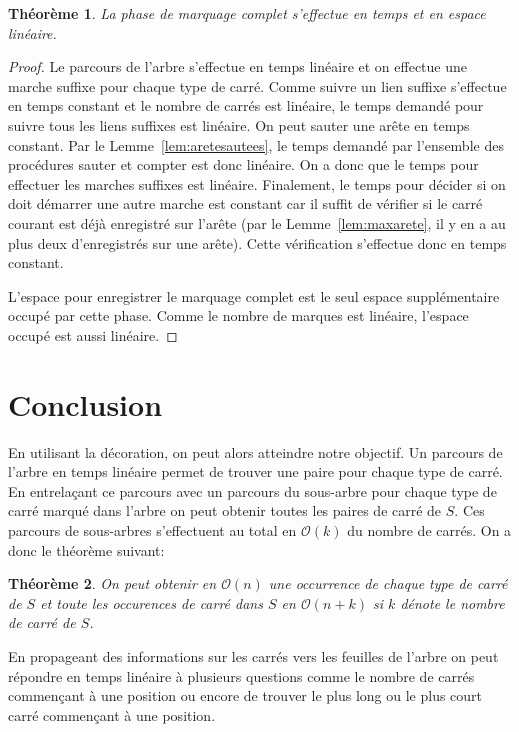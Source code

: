 \documentclass[10pt,letterpaper,oneside]{article}
\newtheorem{theorem}{Théorème}
\newcommand{\bigo}{\mathcal{O}}
\begin{document}
\begin{theorem}
    La phase de marquage complet s'effectue en temps et en espace linéaire.
\end{theorem}
\begin{proof}
    Le parcours de l'arbre s'effectue en temps linéaire et on effectue une marche suffixe pour chaque type de carré. Comme suivre un lien suffixe s'effectue en temps constant et le nombre de carrés est linéaire, le temps demandé pour suivre tous les liens suffixes est linéaire.
    On peut sauter une arête en temps constant. Par le Lemme~\ref{lem:aretesautees}, le temps demandé par l'ensemble des procédures sauter et compter est donc linéaire. On a donc que le temps pour effectuer les marches suffixes est linéaire. Finalement, le temps pour décider si on doit démarrer une autre marche est constant car il suffit de vérifier si le carré courant est déjà enregistré sur l'arête (par le Lemme~\ref{lem:maxarete}, il y en a au plus deux d'enregistrés sur une arête). Cette vérification s'effectue donc en temps constant.
    
    L'espace pour enregistrer le marquage complet est le seul espace supplémentaire occupé par cette phase. Comme le nombre de marques est linéaire, l'espace occupé est aussi linéaire. 
\end{proof}

\section{Conclusion}
En utilisant  la décoration, on peut alors atteindre notre objectif. Un parcours de l'arbre en temps linéaire permet de trouver une paire pour chaque type de carré. En entrelaçant ce parcours avec un parcours du sous-arbre pour chaque type de carré marqué dans l'arbre on peut obtenir toutes les paires de carré de $S$.
Ces parcours de sous-arbres s'effectuent au total en $\bigo(k)$ du nombre de carrés. On a donc le théorème suivant:
\begin{theorem}
    On peut obtenir en $\bigo(n)$ une occurrence de chaque type de carré de $S$ et toute les occurences de carré dans $S$ en $\bigo(n+k)$ si $k$ dénote le nombre de carré de $S$.
\end{theorem}

En propageant des informations sur les carrés vers les feuilles de l'arbre on peut répondre en temps linéaire à plusieurs questions comme le nombre de carrés commençant à une position ou encore de trouver le plus long ou le plus court carré commençant à une position.
\end{document}
